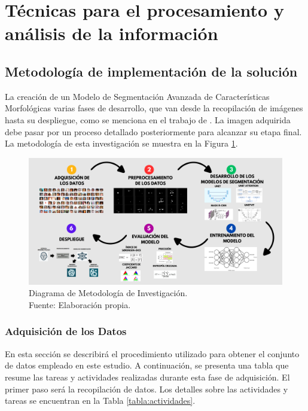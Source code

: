 \section{Técnicas para el procesamiento y análisis de la información}

\subsection{Metodología de implementación de la solución}

La creación de un Modelo de Segmentación Avanzada de Características Morfológicas varias fases de desarrollo, que van desde la recopilación de imágenes hasta su despliegue, como se menciona en el trabajo de \cite{yoon2023}. La imagen adquirida debe pasar por un proceso detallado posteriormente para alcanzar su etapa final. La metodología de esta investigación se muestra en la Figura \ref{3:fig3}.

\begin{figure}[h]
	\begin{center}
		\includegraphics[width=1\textwidth]{3/figures/metodologia.png}
		\caption[Diagrama de Metodología de Investigación]{Diagrama de Metodología de Investigación.\\
			Fuente: Elaboración propia.}
		\label{3:fig3}
	\end{center}
\end{figure}


\subsubsection{Adquisición de los Datos}

En esta sección se describirá el procedimiento utilizado para obtener el conjunto de datos empleado en este estudio. A continuación, se presenta una tabla que resume las tareas y actividades realizadas durante esta fase de adquisición. El primer paso será la recopilación de datos. Los detalles sobre las actividades y tareas se encuentran en la Tabla \ref{tabla:actividades}.
 
